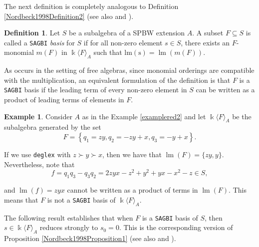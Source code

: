 \documentclass{amsart}
\theoremstyle{definition}
\newtheorem{definition}[theorem]{Definition}
\newtheorem{example}[theorem]{Example}
\theoremstyle{remark}
\numberwithin{equation}{section}
\begin{document}
The next definition is completely analogous to Definition \ref{Nordbeck1998Definition2} (see also  \cite[Definition 6.6.2]{KreuzerRobbiano2005} and \cite[Definition 4]{Khanetal2019}).

\begin{definition}\label{sagbidefinition}
Let $S$ be a subalgebra of a SPBW extension $A$. A subset $F \subseteq S$ is called a {\rm \texttt{SAGBI}} {\em basis} for $S$ if for all non-zero element $s\in S$, there exists an $F$-monomial $m(F)$ in $\Bbbk\langle F\rangle_{A}$ such that $\operatorname{lm(s)}=\operatorname{lm}(m(F)).$
\end{definition}

As occurs in the setting of free algebras, since monomial orderings are compatible with the multiplication, an equivalent formulation of the definition is that $F$ is a \texttt{SAGBI} basis if the leading term of every non-zero element in $S$ can be written as a product of leading terms of elements in $F$.

\begin{example} Consider $A$ as in the Example \ref{examplered2} and let $\Bbbk\langle F\rangle_{A}$ be the subalgebra generated by the set $$
F=\left\{q_1=zy, q_2=-zy+x, q_3=-y+x\right\}.
$$ 

If we use \texttt{deglex} with $z\succ y\succ x$, then we have that $\operatorname{lm}(F)=\{zy,y\}$. Nevertheless, note that 
$$
f = q_1q_3-q_3q_2=2zyx-z^2+y^2+yx-x^2-z \in S, 
$$

and $\operatorname{lm} (f)=zyx$ cannot be written as a product of terms in $\operatorname{lm}(F)$. This means that $F$ is not a \texttt{SAGBI} basis of $\Bbbk\langle F\rangle_{A}$.
\end{example}

The following result establishes that when $F$ is a \texttt{SAGBI} basis of $S$, then $s \in \Bbbk\langle F\rangle_{A}$ reduces strongly to $s_{0}=0$. This is the corresponding version of Proposition \ref{Nordbeck1998Proposition1} (see also \cite[Theorem 6.6.25 (C1)]{KreuzerRobbiano2005} and \cite[Proposition 2]{Khanetal2019}).
\end{document}
